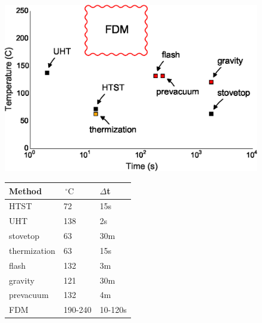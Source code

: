 \begin{refsection}
\begin{figure}
  \centering
  \begin{minipage}[c]{0.60\linewidth}
    \centering
    \includegraphics[width=\textwidth]{sterility/figures/Fig1}
    \par\vspace{0pt}
  \end{minipage}%
  \begin{minipage}[c]{0.40\linewidth}
    \centering \scriptsize
    
    \begin{tabular}{@{}lll@{}}
    \toprule
    Method       & $\,^{\circ}\mathrm{C}$ & $\Delta$t \\ \midrule
    HTST         & 72      & 15s    \\
    UHT          & 138     & 2s     \\
    stovetop     & 63      & 30m    \\
    thermization & 63      & 15s    \\
    flash        & 132     & 3m     \\
    gravity      & 121     & 30m    \\
    prevacuum    & 132     & 4m     \\
    FDM          & 190-240 & 10-120s\\ \bottomrule
    \end{tabular}

    \par\vspace{0pt}
    \end{minipage}


\end{figure}
\end{refsection}
